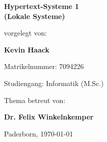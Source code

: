 \begin{titlepage}
\begin{centering}
\vspace*{\fill}

\vspace{3cm} 

\textbf { \LARGE
Hypertext-Systeme 1
\\(Lokale Systeme)
\\[1.2cm]
}

{\large
vorgelegt von:
}

\textbf { \Large
Kevin Haack\\[1cm]
}

{\large
Matrikelnummer: 7094226
\\[2mm]
}

{\large
Studiengang: Informatik (M.Sc.)\\[1cm]
}
    
{\large
Thema betreut von:
}

\textbf { \Large
Dr. Felix Winkelnkemper
\\[1cm]
}

{\large
Paderborn, \today
}
\vfill
\end{centering}
\end{titlepage}
